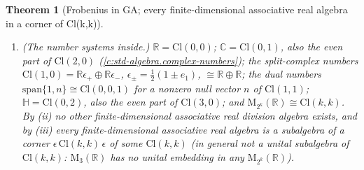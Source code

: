 \documentclass[11pt]{article}
\newtheorem{theorem}{Theorem}[section]
\theoremstyle{definition}
\theoremstyle{plain}
\providecommand{\C}{}\renewcommand{\C}{\mathbb{C}}
\providecommand{\Cl}{}\renewcommand{\Cl}{\mathrm{Cl}}
\providecommand{\HH}{}\renewcommand{\HH}{\mathbb{H}}
\providecommand{\Mat}{}\renewcommand{\Mat}{\mathrm{M}}
\providecommand{\R}{}\renewcommand{\R}{\mathbb{R}}
\begin{document}
\begin{theorem}[Frobenius in GA; every finite-dimensional associative real algebra in a corner of Cl(k,k)]
\begin{enumerate}
\item[(iv)] \emph{(The number systems inside.)} $\R = \Cl(0,0)$; $\C = \Cl(0,1)$, also the even part of $\Cl(2,0)$ (\ref{c:std-algebra.complex-numbers}); the split-complex numbers $\Cl(1,0) = \R\epsilon_{+} \oplus \R\epsilon_{-}$, $\epsilon_{\pm} = \tfrac12(1 \pm e_{1})$, $\cong \R \oplus \R$; the dual numbers $\mathrm{span}\{1, n\} \cong \Cl(0,0,1)$ for a nonzero null vector $n$ of $\Cl(1,1)$; $\HH = \Cl(0,2)$, also the even part of $\Cl(3,0)$; and $\Mat_{2^{k}}(\R) \cong \Cl(k,k)$. By (ii) no other finite-dimensional associative real division algebra exists, and by (iii) every finite-dimensional associative real algebra is a subalgebra of a corner $\epsilon\,\Cl(k,k)\,\epsilon$ of some $\Cl(k,k)$ (in general not a unital subalgebra of $\Cl(k,k)$: $\Mat_{3}(\R)$ has no unital embedding in any $\Mat_{2^{k}}(\R)$).
\end{enumerate}
\end{theorem}
\end{document}
